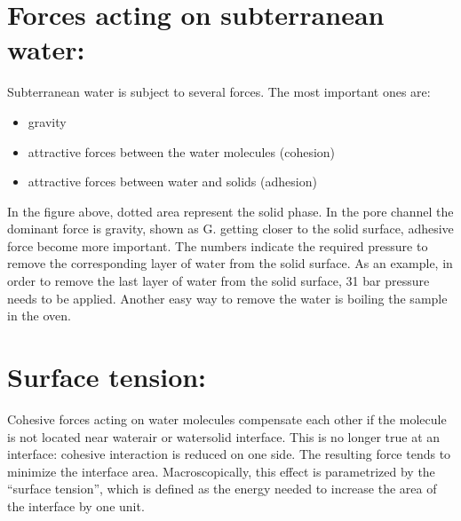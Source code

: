 \documentclass[letterpaper,10pt,english]{jupyterBook}
\let\sphinxpxdimen\pdfpxdimen\else\newdimen\sphinxpxdimen
\begin{document}
\section{Forces acting on subterranean water:}
\label{\detokenize{content/flow/12_subsurface_structure:forces-acting-on-subterranean-water}}
\sphinxAtStartPar
Subterranean water is subject to several forces. The most important ones are:
\begin{itemize}
\item {} 
\sphinxAtStartPar
gravity

\item {} 
\sphinxAtStartPar
attractive forces between the water molecules (cohesion)

\item {} 
\sphinxAtStartPar
attractive forces between water and solids (adhesion)

\end{itemize}

\noindent{\hspace*{\fill}\sphinxincludegraphics[width=400\sphinxpxdimen]{{L02_fig11}.png}\hspace*{\fill}}

\sphinxAtStartPar
In the figure above, dotted area represent the solid phase. In the pore channel the dominant force is gravity, shown as G. getting closer to the solid surface, adhesive force become more important. The numbers indicate the required pressure to remove the corresponding layer of water from the solid surface. As an example, in order to remove the last layer of water from the solid surface, 31 bar pressure needs to be applied. Another easy way to remove the water is boiling the sample in the oven.


\section{Surface tension:}
\label{\detokenize{content/flow/12_subsurface_structure:surface-tension}}
\sphinxAtStartPar
Cohesive forces acting on water molecules compensate each other if the molecule is not located near water\sphinxhyphen{}air or water\sphinxhyphen{}solid interface. This is no longer true at an interface: cohesive interaction is reduced on one side. The resulting force tends to minimize the interface area. Macroscopically, this effect is parametrized by the “surface tension”, which is defined as the energy needed to increase the area of the interface by one unit.

\noindent{\hspace*{\fill}\sphinxincludegraphics[width=300\sphinxpxdimen]{{L02_fig12}.png}\hspace*{\fill}}
\end{document}

